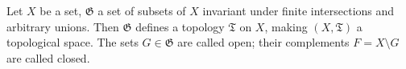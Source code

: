 Let $X$ be a set, $\mathfrak{G}$ a set of subsets of $X$ invariant under finite intersections and arbitrary unions. Then $\mathfrak{G}$ defines a topology $\mathfrak{T}$ on $X$, making $(X, \mathfrak{T})$ a topological space. The sets $G \in \mathfrak{G}$ are called open; their complements $F = X \setminus G$ are called closed.
